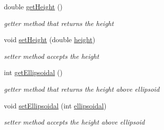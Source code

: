 \begin{DoxyCompactItemize}
double \hyperlink{classcoordinates_1_1_geographic_coordinate_aea53916d3d136bf18262dc096c468104}{get\+Height} ()
\begin{DoxyCompactList}\small\item\em getter method that returns the height \end{DoxyCompactList}\item 
void \hyperlink{classcoordinates_1_1_geographic_coordinate_ab4d53507e2fb93d1e16bffffcf21ecb4}{set\+Height} (double \hyperlink{classcoordinates_1_1_geographic_coordinate_a928334b65b117d99cd724d2c0b9b7ee0}{height})
\begin{DoxyCompactList}\small\item\em setter method accepts the height \end{DoxyCompactList}\item 
int \hyperlink{classcoordinates_1_1_geographic_coordinate_a1e330f3f407a29251d66204401e80e85}{get\+Ellipsoidal} ()
\begin{DoxyCompactList}\small\item\em getter method that returns the height above ellipsoid \end{DoxyCompactList}\item 
void \hyperlink{classcoordinates_1_1_geographic_coordinate_a1c76ad1e5e1cd8c9ff738d3cdf1c4d0a}{set\+Ellipsoidal} (int \hyperlink{classcoordinates_1_1_geographic_coordinate_ab14ea3abf8e94174e4eff69ab983282e}{ellipsoidal})
\begin{DoxyCompactList}\small\item\em setter method accepts the height above ellipsoid \end{DoxyCompactList}\end{DoxyCompactItemize}
